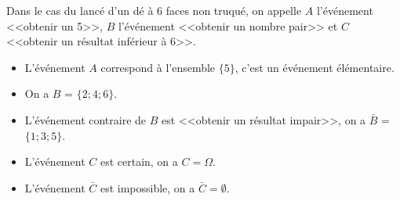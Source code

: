 \documentclass[12pt,a4paper]{article}
\begin{document}
\begin{myex}
	Dans le cas du lancé d'un dé à 6 faces non truqué, on appelle $A$ l'événement <<obtenir un 5>>, $B$ l'événement <<obtenir un nombre pair>> et $C$ <<obtenir un résultat inférieur à 6>>.
	\begin{itemize}
		\item L'événement $A$ correspond à l'ensemble $\{5\}$, c'est un événement élémentaire.
		\item On a $B$ = $\{2;4;6\}$.
		\item L'événement contraire de $B$ est <<obtenir un résultat impair>>, on a $\bar{B} $ = $\{1;3;5\}$.
		\item L'événement  $C$ est certain, on a $C=\Omega$.
		\item L'événement $\bar{C}$ est impossible, on a $\bar{C} = \emptyset$.
	\end{itemize}
\end{myex}
\end{document}
